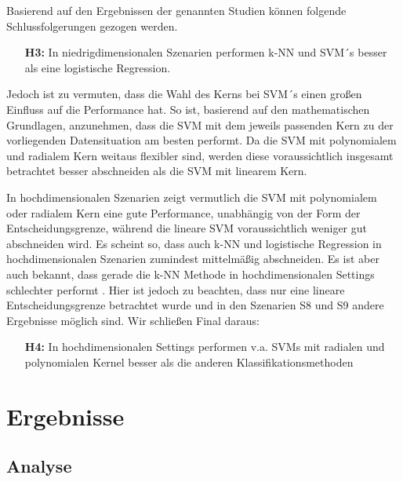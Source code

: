 \documentclass[
]{article}
\begin{document}
Basierend auf den Ergebnissen der genannten Studien können folgende
Schlussfolgerungen gezogen werden.

\begin{minipage}{0.9\linewidth}
\begin{itemize}[leftmargin=0.1\linewidth]
\item[\textbf{H3:}] In niedrigdimensionalen Szenarien performen k-NN und SVM´s besser als eine logistische Regression.
\end{itemize}
\end{minipage}

Jedoch ist zu vermuten, dass die Wahl des Kerns bei SVM´s einen großen
Einfluss auf die Performance hat. So ist, basierend auf den
mathematischen Grundlagen, anzunehmen, dass die SVM mit dem jeweils
passenden Kern zu der vorliegenden Datensituation am besten performt. Da
die SVM mit polynomialem und radialem Kern weitaus flexibler sind,
werden diese voraussichtlich insgesamt betrachtet besser abschneiden als
die SVM mit linearem Kern.\newline

In hochdimensionalen Szenarien zeigt vermutlich die SVM mit polynomialem
oder radialem Kern eine gute Performance, unabhängig von der Form der
Entscheidungsgrenze, während die lineare SVM voraussichtlich weniger gut
abschneiden wird. Es scheint so, dass auch k-NN und logistische
Regression in hochdimensionalen Szenarien zumindest mittelmäßig
abschneiden. Es ist aber auch bekannt, dass gerade die k-NN Methode in
hochdimensionalen Settings schlechter performt
\parencite{jamesIntroductionStatisticalLearning2021}. Hier ist jedoch zu
beachten, dass nur eine lineare Entscheidungsgrenze betrachtet wurde und
in den Szenarien S8 und S9 andere Ergebnisse möglich sind. Wir schließen
Final daraus:

\begin{minipage}{0.9\linewidth}
\begin{itemize}[leftmargin=0.1\linewidth]
\item[\textbf{H4:}] In hochdimensionalen Settings performen v.a. SVMs mit radialen und polynomialen Kernel besser als die anderen Klassifikationsmethoden
\end{itemize}
\end{minipage}
\section{Ergebnisse}

\subsection{Analyse}
\end{document}
